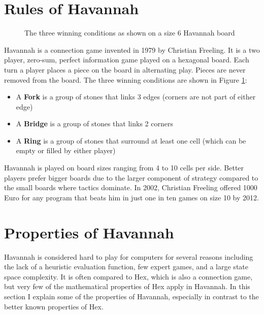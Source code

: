 


\section{Rules of Havannah}


\begin{figure}[tb]
\centering
\begin{HavannahBoard}[board size=6,coordinate style=classical]
\end{HavannahBoard}
\caption{The three winning conditions as shown on a size 6 Havannah board}
\label{fig:rules}
\end{figure}

Havannah is a connection game invented in 1979 by Christian Freeling. It is a two player, zero-sum, perfect information game played on a hexagonal board. Each turn a player places a piece on the board in alternating play. Pieces are never removed from the board. The three winning conditions are shown in Figure \ref{fig:rules}:
\begin{itemize}
	\setlength{\itemsep}{0pt}
	\setlength{\parskip}{0pt}
	\setlength{\parsep}{0pt}
	\item A \textbf{Fork} is a group of stones that links 3 edges (corners are not part of either edge)
	\item A \textbf{Bridge} is a group of stones that links 2 corners
	\item A \textbf{Ring} is a group of stones that surround at least one cell (which can be empty or filled by either player)
\end{itemize}

Havannah is played on board sizes ranging from 4 to 10 cells per side. Better players prefer bigger boards due to the larger component of strategy compared to the small boards where tactics dominate. In 2002, Christian Freeling offered 1000 Euro for any program that beats him in just one in ten games on size 10 by 2012.

\section{Properties of Havannah}

Havannah is considered hard to play for computers for several reasons including the lack of a heuristic evaluation function, few expert games, and a large state space complexity. It is often compared to Hex, which is also a connection game, but very few of the mathematical properties of  Hex apply in Havannah. In this section I explain some of the properties of Havannah, especially in contrast to the better known properties of Hex.

